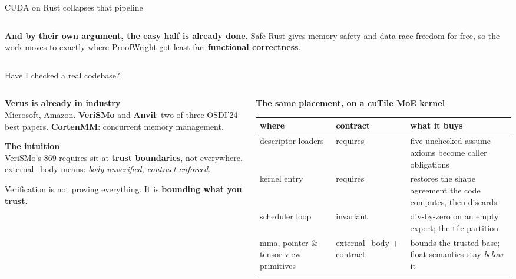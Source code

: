 \documentclass[aspectratio=169,10pt]{beamer}
\newcommand{\code}[1]{{\ttfamily #1}}
\newcommand{\hd}[1]{\textbf{\color{lgTeal}#1}}
\begin{document}
\begin{frame}{CUDA on Rust collapses that pipeline}
\begin{columns}[T]
\begin{column}{0.49\textwidth}
\begin{callout}[lgAccent]
\scriptsize
\textbf{And by their own argument, the easy half is already done.} Safe Rust gives memory safety
and data-race freedom for free, so the work moves to exactly where ProofWright got least far:
\textbf{functional correctness}.
\end{callout}
\end{column}
\end{columns}

\end{frame}

\begin{frame}{Have I checked a real codebase?}

\vspace{4pt}
\begin{columns}[T]
\begin{column}{0.36\textwidth}
{\scriptsize
\hd{Verus is already in industry}\\[2pt]
Microsoft, Amazon. \textbf{VeriSMo} and \textbf{Anvil}: two of three OSDI'24 best papers.
\textbf{CortenMM}: concurrent memory management.

\vspace{6pt}
\hd{The intuition}\\[2pt]
VeriSMo's 869 \code{requires} sit at \textbf{trust boundaries}, not everywhere. \code{external\_body}
means: \emph{body unverified, contract enforced}.

\vspace{4pt}
Verification is not proving everything. It is \textbf{bounding what you trust}.
}
\end{column}

\begin{column}{0.6\textwidth}
{\scriptsize
\hd{The same placement, on a cuTile MoE kernel}\\[3pt]
{\tiny
\renewcommand{\arraystretch}{1.25}
\begin{tabular}{@{}p{20mm}p{15mm}p{33mm}@{}}
\toprule
\textbf{where} & \textbf{contract} & \textbf{what it buys} \\
\midrule
descriptor loaders & \code{requires} & five unchecked \code{assume} axioms become caller
  obligations \\
kernel entry & \code{requires} & restores the shape agreement the code computes, then discards \\
scheduler loop & \code{invariant} & div-by-zero on an empty expert; the tile partition \\
\code{mma}, pointer \& tensor-view primitives & \code{external\_body} $+$ contract & bounds the
  trusted base; float semantics stay \emph{below} it \\
\bottomrule
\end{tabular}
}
}


\end{column}
\end{columns}
\end{frame}
\end{document}
